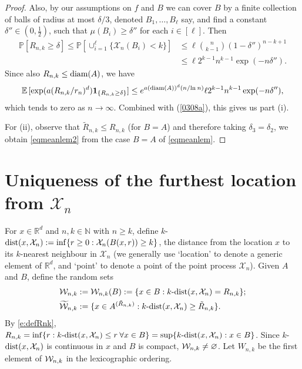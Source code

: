 \documentclass[12pt]{article}
\newcommand{\N}{\mathbb{N}}
\newcommand{\cX}{\mathcal{X}}
\newcommand{\cW}{\mathcal{W}}
\newcommand{\tcW}{\widetilde{\mathcal{W}}}
\renewcommand{\Pr}{\mathbb{P}}
\newcommand{\X}{\mathcal{X}}
\newcommand{\E}{\mathbb E \,}
\renewcommand{\emptyset}{\varnothing}
\newcommand{\diam}{{\rm diam}}
\newcommand{\tR}{{\tilde{R}}}
\newcommand{\R}{\mathbb{R}}
\newcommand{\dist}{{\rm dist}}
\renewcommand{\log}{{\ln \:}}
\newcommand{\eqco}{\setcounter{equation}{0}}
\newcommand{\thco}{\setcounter{theo}{0}}
\newcommand{\prco}{\setcounter{prop}{0}}
\newcommand{\laco}{\setcounter{lemm}{0}}
\newcommand{\coco}{\setcounter{coro}{0}}
\newcommand{\cjco}{\setcounter{conj}{0}}
\newcommand{\deco}{\setcounter{defn}{0}}
\newcommand{\allco}{\eqco  \thco \prco \laco \coco \cjco \deco}
\begin{document}
\begin{proof}
Also, by our assumptions on $f$ and $B$ we can cover $B$ by 
 a finite collection
of balls of radius at most $\delta/3$, denoted $B_1,\ldots,B_\ell$ say,
and find a constant $\delta'' \in (0,\frac12)$,
such that $\mu(B_i) \geq \delta''$ for each $i \in [\ell]$. Then 
\begin{align*}
\Pr[R_{n,k}  \geq \delta] \leq \Pr[ \cup_{i=1}^\ell
\{ \X_n ( B_i) < k \} ] & \leq  \ell \binom{n}{k-1} 
(1- \delta'')^{n-k+1} 
\\
& \leq   \ell 2^{k-1} n^{k-1} \exp(-n \delta'').
\end{align*}  
Since also $R_{n,k} \leq \diam(A)$, 
we have
	\begin{align*}
\E[ \exp(a (R_{n,k}/r_n)^d ) {\bf 1}_{\{R_{n,k} \geq \delta \}} ]
\leq 
		e^{a (\diam (A))^d (n / \log n) } \ell 2^{k-1} 
		n^{k-1} \exp(-n \delta''),
	\end{align*}
which tends to zero as $n \to \infty$.
Combined with (\ref{0308a}), this gives us part (i).

For (ii), observe that $\tR_{n,k} \leq R_{n,k}$
(for $B=A$) and therefore taking $\delta_3 = \delta_2$,
we obtain \eqref{eqmeanlem2} from the case $B=A$ of 
\eqref{eqmeanlem}.
\end{proof}

\section{Uniqueness of the furthest location from $\X_n$}
\label{s:uniqueness}
\allco


For $x \in \R^d$ and $n,k \in \N$ with $n \geq k$, define $k$-$\dist(x,\X_n)
: = \inf \{r \geq 0: \X_n(  B(x,r)) \geq k\}$,
the distance from the location $x$ to its $k$-nearest neighbour in $\X_n$
(we generally use `location' to denote a generic element of $\R^d$, and
`point' to denote a point of the point process $\X_n$).
Given $A$ and $B$, define the random sets
\begin{align}
	\cW_{n,k} &:= \cW_{n,k}(B) :=
	\{x \in B: k{\mbox -}\dist(x, \cX_n) = R_{n,k}\};
	\label{e:cWdef} \\
	\tcW_{n,k} &:= \{x \in A^{(\tR_{n,k})}:
	k{\mbox -}\dist(x, \cX_n) \geq \tR_{n,k}\}
	.
	\label{e:tcWdef}
	\end{align}
	By \eqref{e:defRnk}, $R_{n,k} = \inf\{r: k\mbox{-}\dist(
	x,\X_n) \leq r \: \forall x \in B\}
	= \sup\{k\mbox{-}\dist(x,\X_n):x \in B\}$.
Since $k$-$\dist(x,\cX_n)$ is continuous in $x$ and $B$ 
is compact, ${\cal W}_{n,k} \neq \emptyset$.
	Let $W_{n,k} $ be the first element of
	${\cal W}_{n,k}$ in the lexicographic ordering.
\end{document}
